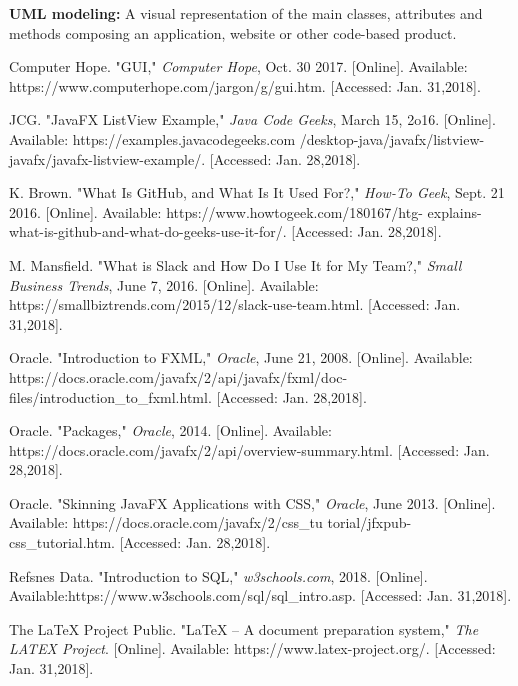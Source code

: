 \documentclass{article}
\begin{document}
\textbf{UML modeling: }A visual representation of the main classes, attributes and methods composing an application, website or other code-based product.\\


\newpage
\begin{thebibliography}{9}

Computer Hope. "GUI," \textit{Computer Hope}, Oct. 30 2017. [Online]. Available: https://www.computerhope.com/jargon/g/gui.htm. [Accessed: Jan. 31,2018].

JCG. "JavaFX ListView Example," \textit{Java Code Geeks}, March 15, 2o16. [Online]. Available: https://examples.javacodegeeks.com /desktop-java/javafx/listview-javafx/javafx-listview-example/. [Accessed: Jan. 28,2018].

K. Brown. "What Is GitHub, and What Is It Used For?," \textit{How-To Geek}, Sept. 21 2016. [Online]. Available: https://www.howtogeek.com/180167/htg- explains-what-is-github-and-what-do-geeks-use-it-for/. [Accessed: Jan. 28,2018].

M. Mansfield. "What is Slack and How Do I Use It for My Team?," \textit{Small Business Trends}, June 7, 2016. [Online]. Available: https://smallbiztrends.com/2015/12/slack-use-team.html. [Accessed: Jan. 31,2018].

Oracle. "Introduction to FXML," \textit{Oracle}, June 21, 2008. [Online]. Available: https://docs.oracle.com/javafx/2/api/javafx/fxml/doc-files/introduction\_to\_fxml.html. [Accessed: Jan. 28,2018].

Oracle. "Packages," \textit{Oracle}, 2014. [Online]. Available: https://docs.oracle.com/javafx/2/api/overview-summary.html. [Accessed: Jan. 28,2018].

Oracle. "Skinning JavaFX Applications with CSS," \textit{Oracle}, June 2013. [Online]. Available: https://docs.oracle.com/javafx/2/css\_tu torial/jfxpub-css\_tutorial.htm. [Accessed: Jan. 28,2018].

Refsnes Data. "Introduction to SQL," \textit{w3schools.com}, 2018. [Online]. Available:https://www.w3schools.com/sql/sql\_intro.asp. [Accessed: Jan. 31,2018].

The LaTeX Project Public. "LaTeX – A document preparation system," \textit{The LATEX Project}. [Online]. Available: https://www.latex-project.org/. [Accessed: Jan. 31,2018].







\end{thebibliography}

 
\end{document}
